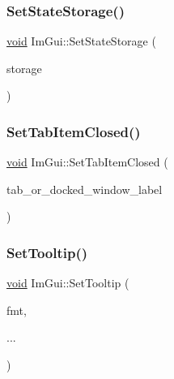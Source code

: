 \mbox{\label{namespaceImGui_a5ba1bf82e3ecdd09dcb6ad733bcf5726}} 
\subsubsection{\texorpdfstring{Set\+State\+Storage()}{SetStateStorage()}}
{\footnotesize\ttfamily \hyperlink{imgui__impl__opengl3__loader_8h_ac668e7cffd9e2e9cfee428b9b2f34fa7}{void} Im\+Gui\+::\+Set\+State\+Storage (\begin{DoxyParamCaption}\item[{\hyperlink{structImGuiStorage}{Im\+Gui\+Storage} $\ast$}]{storage }\end{DoxyParamCaption})}

\mbox{\label{namespaceImGui_aad849238bf7c65665ac6a8a6ffecef98}} 
\subsubsection{\texorpdfstring{Set\+Tab\+Item\+Closed()}{SetTabItemClosed()}}
{\footnotesize\ttfamily \hyperlink{imgui__impl__opengl3__loader_8h_ac668e7cffd9e2e9cfee428b9b2f34fa7}{void} Im\+Gui\+::\+Set\+Tab\+Item\+Closed (\begin{DoxyParamCaption}\item[{const char $\ast$}]{tab\+\_\+or\+\_\+docked\+\_\+window\+\_\+label }\end{DoxyParamCaption})}

\mbox{\label{namespaceImGui_a313073fa01b8a9791f241ef93091ce92}} 
\subsubsection{\texorpdfstring{Set\+Tooltip()}{SetTooltip()}}
{\footnotesize\ttfamily \hyperlink{imgui__impl__opengl3__loader_8h_ac668e7cffd9e2e9cfee428b9b2f34fa7}{void} Im\+Gui\+::\+Set\+Tooltip (\begin{DoxyParamCaption}\item[{const char $\ast$}]{fmt,  }\item[{}]{... }\end{DoxyParamCaption})}


